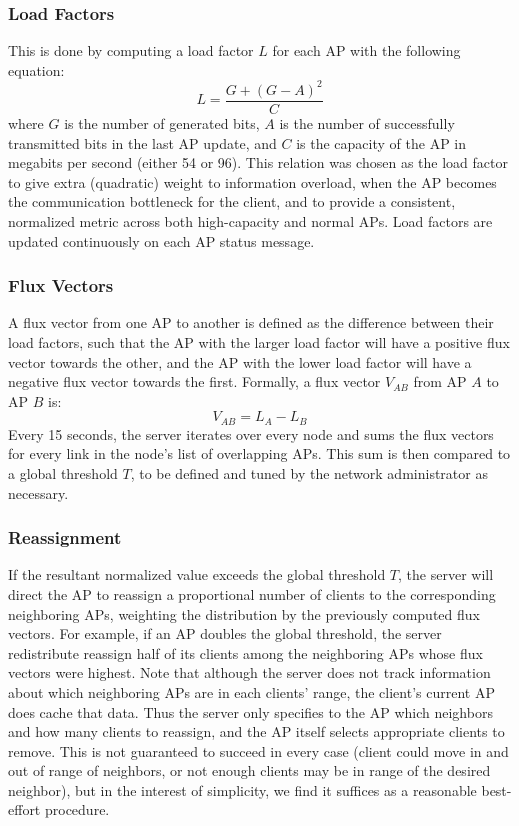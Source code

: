 \documentclass[10pt,journal,compsoc]{IEEEtran}
\begin{document}
		\subsubsection{Load Factors}
		This is done by computing a load factor \(L\) for each AP with the following equation:
		\[L = \dfrac{G + (G-A)^2}{C}\]
		where \(G\) is the number of generated bits, \(A\) is the number of successfully transmitted bits in the last AP update, and \(C\) is the capacity of the AP in megabits per second (either 54 or 96). This relation was chosen as the load factor to give extra (quadratic) weight to information overload, when the AP becomes the communication bottleneck for the client, and to provide a consistent, normalized metric across both high-capacity and normal APs. Load factors are updated continuously on each AP status message.
		
		\subsubsection{Flux Vectors}
		A flux vector from one AP to another is defined as the difference between their load factors, such that the AP with the larger load factor will have a positive flux vector towards the other, and the AP with the lower load factor will have a negative flux vector towards the first. Formally, a flux vector \(V_{AB}\) from AP \(A\) to AP \(B\) is:
		\[V_{AB} = L_A - L_B\]
		Every 15 seconds, the server iterates over every node and sums the flux vectors for every link in the node's list of overlapping APs. This sum is then compared to a global threshold \(T\), to be defined and tuned by the network administrator as necessary.
		
		\subsubsection{Reassignment}
		If the resultant normalized value exceeds the global threshold \(T\), the server will direct the AP to reassign a proportional number of clients to the corresponding neighboring APs, weighting the distribution by the previously computed flux vectors. For example, if an AP doubles the global threshold, the server redistribute reassign half of its clients among the neighboring APs whose flux vectors were highest. Note that although the server does not track information about which neighboring APs are in each clients' range, the client's current AP does cache that data. Thus the server only specifies to the AP which neighbors and how many clients to reassign, and the AP itself selects appropriate clients to remove. This is not guaranteed to succeed in every case (client could move in and out of range of neighbors, or not enough clients may be in range of the desired neighbor), but in the interest of simplicity, we find it suffices as a reasonable best-effort procedure.
		
\end{document}
